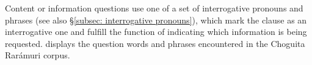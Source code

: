 



Content or information questions use one of a set of interrogative pronouns and phrases (see also §\ref{subsec: interrogative pronouns}), which mark the clause as an interrogative one and fulfill the function of indicating which information is being requested.  displays the question words and phrases encountered in the Choguita Rarámuri corpus.



